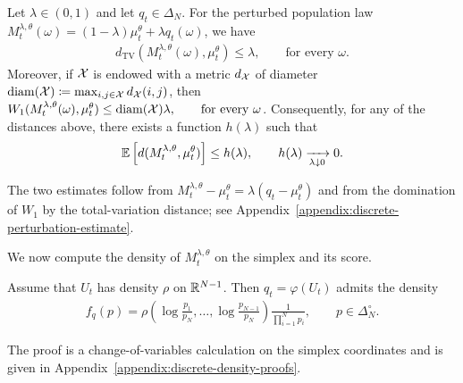\begin{theorem}
    \label{theorem:discrete-perturbation-estimate}
    Let $\lambda\in(0,1)$ and let $q_t\in\Delta_N$. For the perturbed population law $M_t^{\lambda,\theta}(\omega) = (1-\lambda)\mu_t^\theta + \lambda q_t(\omega)$, we have \begin{align}
        d_\mathrm{TV}(M_t^{\lambda,\theta}(\omega), \mu_t^\theta) \leq \lambda, \qquad \text{for every }\omega.
    \end{align}
    Moreover, if ${\cal X}$ is endowed with a metric $d_{\cal X}$ of diameter $\mathrm{diam}({\cal X})\coloneqq \max_{i,j\in{\cal X}} d_{\cal X}(i,j)$, then $W_1(M_t^{\lambda,\theta}(\omega), \mu_t^\theta)\leq \mathrm{diam}({\cal X})\lambda,\qquad \text{for every }\omega$.
    Consequently, for any of the distances above, there exists a function $h(\lambda)$ such that
    \begin{align}
        \mathbb{E}\left[d(M_t^{\lambda,\theta}, \mu_t^\theta) \right]\leq h(\lambda),\qquad h(\lambda)\xrightarrow[\lambda\downarrow0]{}0.
    \end{align}
\end{theorem}

The two estimates follow from $M_t^{\lambda,\theta}-\mu_t^\theta=\lambda(q_t-\mu_t^\theta)$ and from the domination of $W_1$ by the total-variation distance; see Appendix~\ref{appendix:discrete-perturbation-estimate}.

We now compute the density of $M_t^{\lambda,\theta}$ on the simplex and its score.

\begin{proposition}
    \label{prop:discrete-perturbation-density}
    Assume that $U_t$ has density $\rho$ on $\mathbb{R}^{N-1}$. Then $q_t = \varphi(U_t)$ admits the density
    \begin{align}
        f_q(p) = \rho\left(\log\frac{p_1}{p_N},\ldots,\log\frac{p_{N-1}}{p_N} \right) \frac{1}{\prod_{i=1}^N p_i}, \qquad p\in\Delta_N^\circ.
    \end{align}
\end{proposition}

The proof is a change-of-variables calculation on the simplex coordinates and is given in Appendix~\ref{appendix:discrete-density-proofs}.

